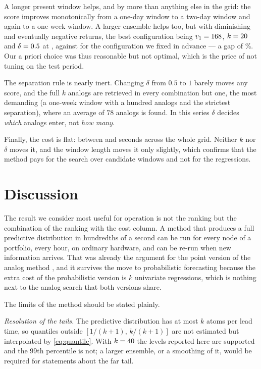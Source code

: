 \documentclass[12pt,a4paper]{article}
\begin{document}
A longer present window helps, and by more than anything else in the grid: the
score improves monotonically from a one-day window to a two-day window and
again to a one-week window. A larger ensemble helps too, but with diminishing
and eventually negative returns, the best configuration being
$v_1=168{}$, $k=20{}$ and $\delta=0.5{}$ at
\SENSBESTCRPS{}, against \SENSAPRIORI{} for the configuration we fixed in
advance — a gap of \SENSGAP\%. Our a priori choice was thus reasonable but not
optimal, which is the price of not tuning on the test period.

The separation rule is nearly inert. Changing $\delta$ from $0.5$ to $1$
barely moves any score, and the full $k$ analogs are retrieved in every
combination but one, the most demanding (a one-week window with a hundred
analogs and the strictest separation), where an average of $78$ analogs is
found. In this series $\delta$ decides \emph{which} analogs enter, not
\emph{how many}.

Finally, the cost is flat: between \SENSTMIN{} and \SENSTMAX{} seconds across
the whole grid. Neither $k$ nor $\delta$ moves it, and the window length moves
it only slightly, which confirms that the method pays for the search over
candidate windows and not for the regressions.

\section{Discussion}
\label{sec:discussion}

The result we consider most useful for operation is not the ranking but the
combination of the ranking with the cost column. A method that produces a full
predictive distribution in hundredths of a second can be run for every node of
a portfolio, every hour, on ordinary hardware, and can be re-run when new
information arrives. That was already the argument for the point version of
the analog method \citep{LezamaLope2023}, and it survives the move to
probabilistic forecasting because the extra cost of the probabilistic version
is $k$ univariate regressions, which is nothing next to the analog search that
both versions share.

The limits of the method should be stated plainly.

\textit{Resolution of the tails.} The predictive distribution has at most $k$
atoms per lead time, so quantiles outside $[1/(k+1),\,k/(k+1)]$ are not
estimated but interpolated by \eqref{eq:quantile}. With $k=40{}$ the
levels reported here are supported and the 99th percentile is not; a larger
ensemble, or a smoothing of it, would be required for statements about the far
tail.
\end{document}
